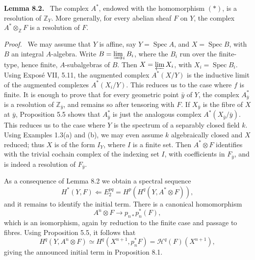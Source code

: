\documentclass[11pt]{article}
\newcommand{\Hh}{\mathcal{H}}
\newcommand{\Zz}{\mathbb{Z}}
\newcommand{\Spec}{\operatorname{Spec}}
\newenvironment{statement}[1]{\par\medskip\noindent\textbf{#1.}\ }{\par\medskip}
\newenvironment{prooftext}{\par\noindent\emph{Proof.}\ }{\par\medskip}
\begin{document}
\begin{statement}{Lemma 8.2}
The complex \(A^*\), endowed with the homomorphism \((*)\), is a resolution of \(\Zz_Y\). More generally, for every abelian sheaf \(F\) on \(Y\), the complex \(A^*\otimes_{\Zz}F\) is a resolution of \(F\).
\end{statement}

\begin{prooftext}
We may assume that \(Y\) is affine, say \(Y=\Spec A\), and \(X=\Spec B\), with \(B\) an integral \(A\)-algebra. Write \(B=\varinjlim_iB_i\), where the \(B_i\) run over the finite-type, hence finite, \(A\)-subalgebras of \(B\). Then \(X=\varprojlim X_i\), with \(X_i=\Spec B_i\). Using Expos\'e VII, 5.11, the augmented complex \(A^*(X/Y)\) is the inductive limit of the augmented complexes \(A^*(X_i/Y)\). This reduces us to the case where \(f\) is finite. It is enough to prove that for every geometric point \(\bar y\) of \(Y\), the complex \(A^*_{\bar y}\) is a resolution of \(\Zz_{\bar y}\), and remains so after tensoring with \(F\). If \(X_{\bar y}\) is the fibre of \(X\) at \(\bar y\), Proposition 5.5 shows that \(A^*_{\bar y}\) is just the analogous complex \(A^*(X_{\bar y}/\bar y)\). This reduces us to the case where \(Y\) is the spectrum of a separably closed field \(k\). Using Examples 1.3(a) and (b), we may even assume \(k\) algebraically closed and \(X\) reduced; thus \(X\) is of the form \(I_Y\), where \(I\) is a finite set. Then \(A^*\otimes F\) identifies with the trivial cochain complex of the indexing set \(I\), with coefficients in \(F_{\bar y}\), and is indeed a resolution of \(F_{\bar y}\).
\end{prooftext}

As a consequence of Lemma 8.2 we obtain a spectral sequence
\[
H^*(Y,F)\Longleftarrow E_2^{pq}=H^p(H^q(Y,A^*\otimes F)),
\]
and it remains to identify the initial term. There is a canonical homomorphism
\[
A^n\otimes F\longrightarrow p_{n*}p_n^*(F),
\]
which is an isomorphism, again by reduction to the finite case and passage to fibres. Using Proposition 5.5, it follows that
\[
H^q(Y,A^n\otimes F)\simeq H^q(X^{n+1},p_n^*F)=\Hh^q(F)(X^{n+1}),
\]
giving the announced initial term in Proposition 8.1.
\end{document}
